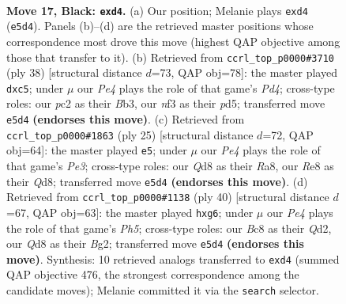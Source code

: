 \documentclass[11pt]{article}
\begin{document}
\clearpage

\begin{figure}[p]\centering
\begin{subfigure}{0.46\textwidth}\centering
\resizebox{\linewidth}{!}{%
\newchessgame
\chessboard[
  setfen={1rbqrk2/p1p2p1p/P1pp4/4p3/2PPP1n1/5N2/2P2PP1/R1BQ1RK1 b - - 0 17},
  showmover=false,
  pgfstyle=straightmove, color=movearrow, markmove={e5-d4}
]}
\caption{}
\end{subfigure}\hfill
\begin{subfigure}{0.46\textwidth}\centering
\resizebox{\linewidth}{!}{%
\newchessgame
\chessboard[
  setfen={r4rk1/3q1ppp/n7/ppppPbN1/3P4/PBP4P/5PP1/R2Q1RK1 w - - 0 20},
  showmover=false,
  pgfstyle=straightmove, color=movearrow, markmove={d4-c5}
]}
\caption{}
\end{subfigure}
\\[4pt]
\begin{subfigure}{0.46\textwidth}\centering
\resizebox{\linewidth}{!}{%
\newchessgame
\chessboard[
  setfen={r2qkb1r/p4ppp/3pp3/3P4/1p2n3/6P1/1PP1NP1P/R1BQ1RK1 b kq - 0 13},
  showmover=false,
  pgfstyle=straightmove, color=movearrow, markmove={e6-e5}
]}
\caption{}
\end{subfigure}\hfill
\begin{subfigure}{0.46\textwidth}\centering
\resizebox{\linewidth}{!}{%
\newchessgame
\chessboard[
  setfen={1rbq1rk1/7p/4p1p1/1pp1p1pP/3nN3/3P2P1/PP1Q2B1/R5KR w - - 0 21},
  showmover=false,
  pgfstyle=straightmove, color=movearrow, markmove={h5-g6}
]}
\caption{}
\end{subfigure}
\caption{\textbf{Move 17, Black: \texttt{exd4}.} (a) Our position; Melanie plays \texttt{exd4} (\texttt{e5d4}). Panels (b)--(d) are the retrieved master positions whose correspondence most drove this move (highest QAP objective among those that transfer to it). (b) Retrieved from \texttt{ccrl\_top\_p0000\#3710} (ply 38) [structural distance $d$=73, QAP obj=78]: the master played \texttt{dxc5}; under $\mu$ our \emph{Pe4} plays the role of that game's \emph{Pd4}; cross-type roles: our \emph{p}c2 as their \emph{B}b3, our \emph{n}f3 as their \emph{p}d5; transferred move \texttt{e5d4} \textbf{(endorses this move)}. (c) Retrieved from \texttt{ccrl\_top\_p0000\#1863} (ply 25) [structural distance $d$=72, QAP obj=64]: the master played \texttt{e5}; under $\mu$ our \emph{Pe4} plays the role of that game's \emph{Pe3}; cross-type roles: our \emph{Q}d8 as their \emph{R}a8, our \emph{R}e8 as their \emph{Q}d8; transferred move \texttt{e5d4} \textbf{(endorses this move)}. (d) Retrieved from \texttt{ccrl\_top\_p0000\#1138} (ply 40) [structural distance $d$=67, QAP obj=63]: the master played \texttt{hxg6}; under $\mu$ our \emph{Pe4} plays the role of that game's \emph{Ph5}; cross-type roles: our \emph{B}c8 as their \emph{Q}d2, our \emph{Q}d8 as their \emph{B}g2; transferred move \texttt{e5d4} \textbf{(endorses this move)}. Synthesis: 10 retrieved analogs transferred to \texttt{exd4} (summed QAP objective 476, the strongest correspondence among the candidate moves); Melanie committed it via the \texttt{search} selector.}
\label{fig:thought-m33}
\end{figure}
\end{document}
